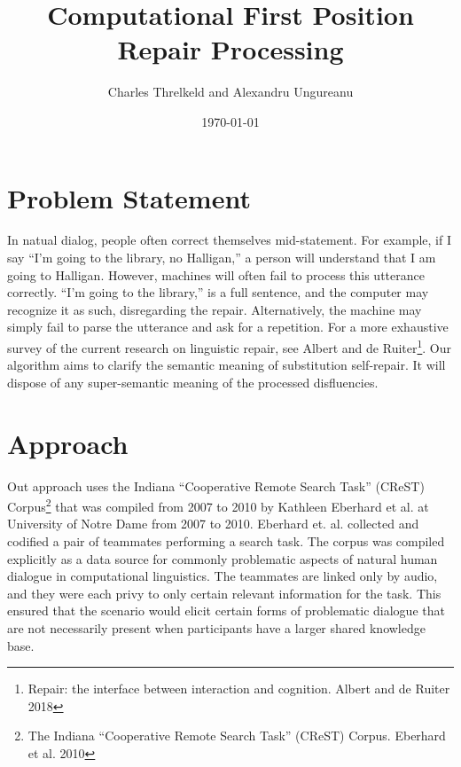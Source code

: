 \documentclass{article}
\title{Computational First Position Repair Processing}
\author{Charles Threlkeld and Alexandru Ungureanu}
\date{\today}
\begin{document}
\maketitle

\section{Problem Statement}

\begin{flushleft}
In natual dialog, people often correct themselves mid-statement. For example, if I say ``I'm going to the library, no Halligan,'' a person will understand that I am going to Halligan. However, machines will often fail to process this utterance correctly. ``I'm going to the library,'' is a full sentence, and the computer may recognize it as such, disregarding the repair. Alternatively, the machine may simply fail to parse the utterance and ask for a repetition. For a more exhaustive survey of the current research on linguistic repair, see Albert and de Ruiter\footnote{Repair: the interface between interaction and cognition. Albert and de Ruiter 2018}. Our algorithm aims to clarify the semantic meaning of substitution self-repair. It will dispose of any super-semantic meaning of the processed disfluencies.

\end{flushleft}

\section{Approach}

\begin{flushleft}

  Out approach uses the Indiana ``Cooperative Remote Search Task'' (CReST) Corpus\footnote{The Indiana ``Cooperative Remote Search Task'' (CReST) Corpus. Eberhard et al. 2010} that was compiled from 2007 to 2010 by Kathleen Eberhard et al. at University of Notre Dame from 2007 to 2010. Eberhard et. al. collected and codified a pair of teammates performing a search task. The corpus was compiled explicitly as a data source for commonly problematic aspects of natural human dialogue in computational linguistics. The teammates are linked only by audio, and they were each privy to only certain relevant information for the task. This ensured that the scenario would elicit certain forms of problematic dialogue that are not necessarily present when participants have a larger shared knowledge base.

\end{flushleft}
\end{document}
